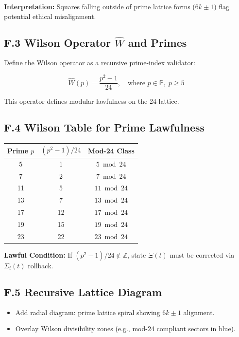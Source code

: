 \documentclass[12pt]{article}
\begin{document}
\noindent
\textbf{Interpretation:} Squares falling outside of prime lattice forms ($6k \pm 1$) flag potential ethical misalignment.

\subsection*{F.3 Wilson Operator $\hat{W}$ and Primes}

Define the Wilson operator as a recursive prime-index validator:

\begin{equation}
\hat{W}(p) = \frac{p^2 - 1}{24}, \quad \text{where } p \in \mathbb{P}, \; p \geq 5
\end{equation}

\noindent
This operator defines modular lawfulness on the 24-lattice.

\subsection*{F.4 Wilson Table for Prime Lawfulness}

\begin{center}
\begin{tabular}{c|c|c}
Prime $p$ & $(p^2 - 1)/24$ & Mod-24 Class \\
\hline
5 & 1 & $5 \bmod 24$ \\
7 & 2 & $7 \bmod 24$ \\
11 & 5 & $11 \bmod 24$ \\
13 & 7 & $13 \bmod 24$ \\
17 & 12 & $17 \bmod 24$ \\
19 & 15 & $19 \bmod 24$ \\
23 & 22 & $23 \bmod 24$ \\
\end{tabular}
\end{center}

\noindent
\textbf{Lawful Condition:} If $(p^2 - 1)/24 \notin \mathbb{Z}$, state $\Xi(t)$ must be corrected via $\Sigma_i(t)$ rollback.

\subsection*{F.5 Recursive Lattice Diagram}

\begin{itemize}
    \item Add radial diagram: prime lattice spiral showing $6k \pm 1$ alignment.
    \item Overlay Wilson divisibility zones (e.g., mod-24 compliant sectors in blue).
\end{itemize}
\end{document}

